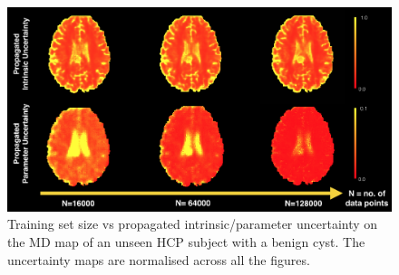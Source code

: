 \begin{figure}[ht] 
	\centering
	\includegraphics[width=\linewidth]{chapter_3/figures/fig_8_5.png}
	\small
	\caption{\footnotesize Training set size vs propagated intrinsic/parameter uncertainty on the MD map of an unseen HCP subject with a benign cyst. The uncertainty maps are normalised across all the figures. } 
	\label{fig:uncertainty_decomp_1}
\end{figure}
%
